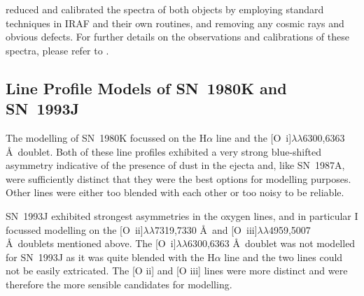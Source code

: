 \citet{Milisavljevic2012} reduced and calibrated the spectra of both objects by employing
standard techniques in IRAF and their own routines, and removing any cosmic rays and obvious defects. For further details on the observations and calibrations of these spectra, please refer to \citet{Milisavljevic2012}. 




\subsection{Line Profile Models of SN~1980K and SN~1993J}
\label{80K_93J_models}
The modelling of SN~1980K focussed on the H$\alpha$ line and the [O~{\sc i}]$\lambda\lambda$6300,6363 \AA\  doublet.  Both of these line profiles exhibited a very strong blue-shifted asymmetry indicative of the presence of dust in the ejecta and, like SN~1987A, were sufficiently distinct that they were the best options for modelling purposes.  Other lines were either too blended with each other or too noisy to be reliable.  

SN~1993J exhibited strongest asymmetries in the oxygen lines, and in particular I focussed modelling on the [O~{\sc ii}]$\lambda\lambda$7319,7330 \AA\  and [O~{\sc iii}]$\lambda\lambda$4959,5007 \AA\  doublets mentioned above.  The [O~{\sc i}]$\lambda\lambda$6300,6363 \AA\ doublet was not modelled for SN~1993J as it was quite blended with the H$\alpha$ line and the two lines could not be easily extricated.  The [O {\sc ii}] and [O {\sc iii}] lines were more distinct and were therefore the more sensible candidates for modelling.

